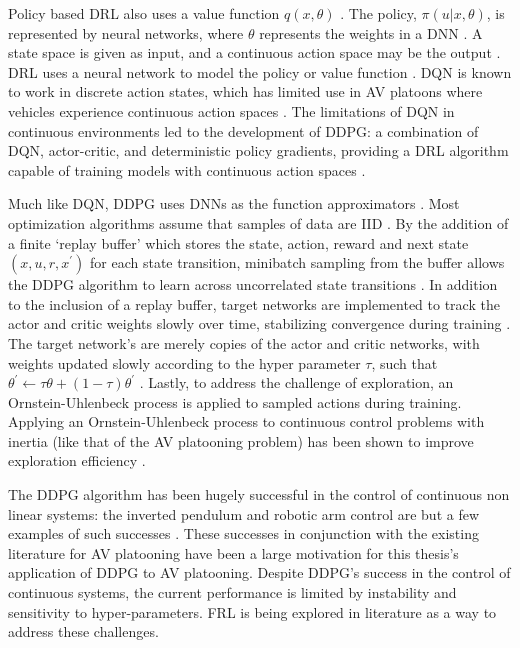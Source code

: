 Policy based DRL also uses a value function $q(x, \theta)$
\cite{sutton2018reinforcement, sWang2017}. The policy, $\pi(u|x, \theta)$, is represented
by neural networks, where $\theta$ represents the weights in a DNN
\cite{Zhu2018}.  A state space is given as input, and a continuous action space may be
the output \cite{Zhu2018}. DRL uses a neural network to model the policy or value
function \cite{Zhu2018}.  DQN is known to work in discrete action states, which has
limited use in AV platoons where vehicles experience continuous action spaces
\cite{Zhu2018, sWang2017}. The limitations of DQN in continuous environments led to
the development of DDPG: a combination of DQN, actor-critic, and deterministic
policy gradients, providing a DRL algorithm capable of training models with continuous
action spaces \cite{Lillicrap2016, sWang2017}.

Much like DQN, DDPG uses DNNs as the function approximators \cite{Zhu2018}.  Most
optimization algorithms assume that samples of data are IID \cite{Lillicrap2016}.
By the addition of a finite `replay buffer' which stores the state, action, reward
and next state $(x, u, r, x^{'})$ for each state transition, minibatch sampling from
the buffer allows the DDPG algorithm to learn across uncorrelated state transitions
\cite{Lillicrap2016}.  In addition to the inclusion of a replay buffer, target
networks are implemented to track the actor and critic weights slowly over time, stabilizing
convergence during training \cite{Lillicrap2016, Zhu2018}.  The target network's are
merely copies of the actor and critic networks, with weights updated slowly according to
the hyper parameter $\tau$, such that
$ \theta^{'} \leftarrow \tau\theta + (1-\tau)\theta^{'} $ \cite{Lillicrap2016}.
Lastly, to address the challenge of exploration, an Ornstein-Uhlenbeck process is
applied to sampled actions during training. Applying an Ornstein-Uhlenbeck process
to continuous control problems with inertia (like that of the AV platooning problem)
has been shown to improve exploration efficiency \cite{Lillicrap2016}.

The DDPG algorithm has been hugely successful in the control of continuous non
linear systems: the inverted pendulum and robotic arm control are but a few examples
of such successes \cite{Lim2020}. These successes in conjunction with the existing
literature for AV platooning have been a large motivation for this thesis's application of
DDPG to AV platooning. Despite DDPG's success in the control of continuous systems, the
current performance is limited by instability and sensitivity to hyper-parameters.
FRL is being explored in literature as a way to address these challenges.

